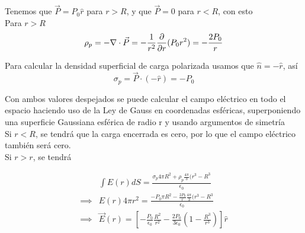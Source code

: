 \begin{solucion}{6}
    
    Tenemos que $\Vec{P} = P_0\hat{r}$ para $r > R$, y que $\Vec{P} = 0$ para $r < R$, con esto\\
    
    Para $r > R$
    \begin{equation}
            \rho_p = -\nabla\cdot\Vec{P}\\
            = -\frac{1}{r^2}\frac{\partial}{\partial r}(P_0r^2)\\
            = -\frac{2P_0}{r}
        \nonumber
    \end{equation}
    
    Para calcular la densidad superficial de carga polarizada usamos que $\hat{n} = -\hat{r}$, así
    \begin{equation}
            \sigma_p = \Vec{P}\cdot(-\hat{r}) = -P_0
        \nonumber
    \end{equation}
    
    Con ambos valores despejados se puede calcular el campo eléctrico en todo el espacio haciendo uso de la Ley de Gauss en coordenadas esféricas, superponiendo una superficie Gaussiana esférica de radio r y usando argumentos de simetría\\
    
    Si $r < R$, se tendrá que la carga encerrada es cero, por lo que el campo eléctrico también será cero.\\
    
    Si $r > r$, se tendrá
    
    \begin{equation}
        \begin{split}
            &\int E(r)dS = \frac{\sigma_p4\pi R^2 + \rho_p \frac{4\pi}{3}(r^3 - R^3}{\epsilon_0}\\
            \implies &E(r) 4\pi r^2= \frac{-P_0\pi R^2 -\frac{2P_0}{r} \frac{4\pi}{3}(r^3 - R^3}{\epsilon_0}\\
            \implies &\Vec E(r) = \left[ -\frac{P_0}{\epsilon_0}\frac{R^2}{r^2} - \frac{2P_0}{3\epsilon_0}\left( 1-\frac{R^3}{r^3} \right)\right]\hat{r}
        \end{split}
        \nonumber
    \end{equation}
    
\end{solucion}

\bigbreak

